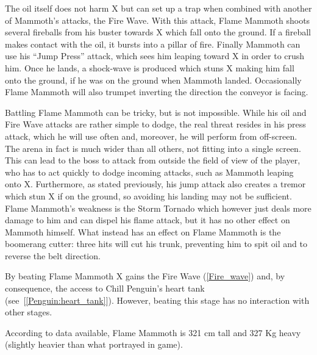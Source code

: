 The oil itself does not harm X but can set up a trap when combined with another of Mammoth's attacks, the Fire Wave. With this attack, Flame Mammoth shoots several fireballs from his buster towards X which fall onto the ground. If a fireball makes contact with the oil, it bursts into a pillar of fire. Finally Mammoth can use his ``Jump Press'' attack, which sees him leaping toward X in order to crush him. Once he lands, a shock-wave is produced which stuns X making him fall onto the ground, if he was on the ground when Mammoth landed. Occasionally Flame Mammoth will also trumpet inverting the direction the conveyor is facing. 

Battling Flame Mammoth can be tricky, but is not impossible. While his oil and Fire Wave attacks are rather simple to dodge, the real threat resides in his press attack, which he will use often and, moreover, he will perform from off-screen. The arena in fact is much wider than all others, not fitting into a single screen. This can lead to the boss to attack from outside the field of view of the player, who has  to act quickly to dodge incoming attacks, such as Mammoth leaping onto X. Furthermore, as stated previously, his jump attack also creates a tremor which stun X if on the ground, so avoiding his landing may not be sufficient. Flame Mammoth's weakness is the Storm Tornado which however just deals more damage to him and can dispel his flame attack, but it has no other effect on Mammoth himself. What instead has an effect on Flame Mammoth is the boomerang cutter: three hits will cut his trunk, preventing him to spit oil and to reverse the belt direction.

By beating Flame Mammoth X gains the Fire Wave (\ref{Fire_wave}) and, by consequence, the access to Chill Penguin's heart tank (see~[\ref{Penguin:heart_tank}]). However, beating this stage has no interaction with other stages.

According to data available, Flame Mammoth is 321 cm tall and 327 Kg heavy (slightly heavier than what portrayed in game).

